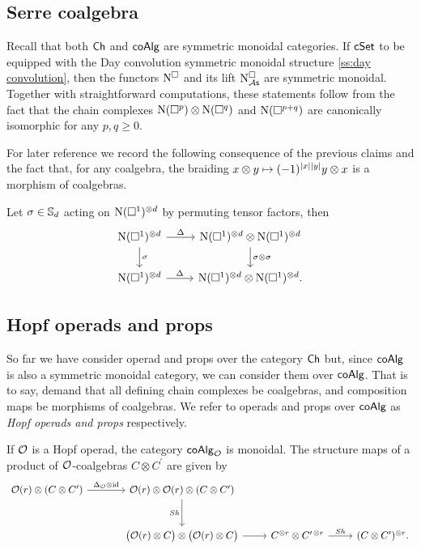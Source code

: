 \subsection{Serre coalgebra} \label{ss:serre coalgebra sym monoidal}

Recall that both $\Ch$ and $\coAlg$ are symmetric monoidal categories.
If $\cSet$ to be equipped with the Day convolution symmetric monoidal structure \cref{ss:day convolution}, then the functors $\cchains$ and its lift $\cchainsAS$ are symmetric monoidal.
Together with straightforward computations, these statements follow from the fact that the chain complexes $\chains(\cube^p) \otimes \chains(\cube^q)$ and $\chains(\cube^{p+q})$ are canonically isomorphic for any $p, q \geq 0$.

For later reference we record the following consequence of the previous claims and the fact that, for any coalgebra, the braiding $x \otimes y \mapsto (-1)^{\bars{x} \bars{y}} y \otimes x$ is a morphism of coalgebras.

\begin{lemma} \label{l:serre diagonal invariant}
	Let $\sigma \in \S_d$ acting on $\chains(\cube^1)^{\otimes d}$ by permuting tensor factors, then
	\begin{equation*}
	\begin{tikzcd}
	\chains(\cube^1)^{\otimes d} \arrow[r, "\Delta"] \arrow[d, "\sigma"] &
	\chains(\cube^1)^{\otimes d} \otimes \chains(\cube^1)^{\otimes d} \arrow[d, "\sigma \otimes \sigma"] \\
	\chains(\cube^1)^{\otimes d} \arrow[r, "\Delta"] &
	\chains(\cube^1)^{\otimes d} \otimes \chains(\cube^1)^{\otimes d}.
	\end{tikzcd}
	\end{equation*}
\end{lemma}

\subsection{Hopf operads and props}

So far we have consider operad and props over the category $\Ch$ but, since $\coAlg$ is also a symmetric monoidal category, we can consider them over $\coAlg$.
That is to say, demand that all defining chain complexes be coalgebras, and composition maps be morphisms of coalgebras.
We refer to operads and props over $\coAlg$ as \textit{Hopf operads and props} respectively.

If $\O$ is a Hopf operad, the category $\coAlg_\O$ is monoidal.
The structure maps of a product of $\O$-coalgebras $C \otimes C^\prime$ are given by
\begin{equation*}
\begin{tikzcd} [column sep = normal, row sep=large]
\O(r) \otimes (C \otimes C^\prime) \arrow[r, "\Delta_\O \otimes \id"] &[10 pt] \O(r) \otimes \O(r) \otimes (C \otimes C^\prime) \arrow[d, "Sh"'] & & \\ &
\big(\O(r) \otimes C \big) \otimes \big( \O(r) \otimes C \big) \arrow[r] & 
C^{\otimes r} \otimes C^{\prime\, \otimes r} \arrow[r, "Sh"] &
(C \otimes C^\prime)^{\otimes r}.
\end{tikzcd}
\end{equation*}

